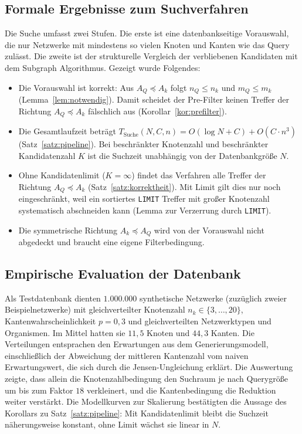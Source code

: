 \documentclass[a4paper,12pt, twoside]{report}
\theoremstyle{definition}
\begin{document}
\subsection{Formale Ergebnisse zum Suchverfahren}

Die Suche umfasst zwei Stufen. Die erste ist eine datenbankseitige Vorauswahl, die nur Netzwerke mit mindestens so vielen Knoten und Kanten wie das Query zulässt. Die zweite ist der strukturelle Vergleich der verbliebenen Kandidaten mit dem Subgraph Algorithmus. Gezeigt wurde Folgendes:

\begin{itemize}
	\item Die Vorauswahl ist korrekt: Aus $A_Q \preceq A_k$ folgt $n_Q \le n_k$ und $m_Q \le m_k$ (Lemma~\ref{lem:notwendig}). Damit scheidet der Pre-Filter keinen Treffer der Richtung $A_Q \preceq A_k$ fälschlich aus (Korollar~\ref{kor:prefilter}).
	\item Die Gesamtlaufzeit beträgt $T_{\text{Suche}}(N,C,n)=O(\log N + C)+O(C\cdot n^3)$ (Satz~\ref{satz:pipeline}). Bei beschränkter Knotenzahl und beschränkter Kandidatenzahl $K$ ist die Suchzeit unabhängig von der Datenbankgröße $N$.
	\item Ohne Kandidatenlimit ($K=\infty$) findet das Verfahren alle Treffer der Richtung $A_Q \preceq A_k$ (Satz~\ref{satz:korrektheit}). Mit Limit gilt dies nur noch eingeschränkt, weil ein sortiertes \texttt{LIMIT} Treffer mit großer Knotenzahl systematisch abschneiden kann (Lemma zur Verzerrung durch \texttt{LIMIT}).
	\item Die symmetrische Richtung $A_k \preceq A_Q$ wird von der Vorauswahl nicht abgedeckt und braucht eine eigene Filterbedingung.
\end{itemize}

\subsection{Empirische Evaluation der Datenbank}

Als Testdatenbank dienten $1.000.000$ synthetische Netzwerke (zuzüglich zweier Beispielnetzwerke) mit gleichverteilter Knotenzahl $n_k\in\{3,\dots,20\}$, Kantenwahrscheinlichkeit $p=0{,}3$ und gleichverteilten Netzwerktypen und Organismen. Im Mittel hatten sie $11{,}5$ Knoten und $44{,}3$ Kanten. Die Verteilungen entsprachen den Erwartungen aus dem Generierungsmodell, einschließlich der Abweichung der mittleren Kantenzahl vom naiven Erwartungswert, die sich durch die Jensen-Ungleichung erklärt. Die Auswertung zeigte, dass allein die Knotenzahlbedingung den Suchraum je nach Querygröße um bis zum Faktor $18$ verkleinert, und die Kantenbedingung die Reduktion weiter verstärkt. Die Modellkurven zur Skalierung bestätigten die Aussage des Korollars zu Satz~\ref{satz:pipeline}: Mit Kandidatenlimit bleibt die Suchzeit näherungsweise konstant, ohne Limit wächst sie linear in $N$.
\end{document}
